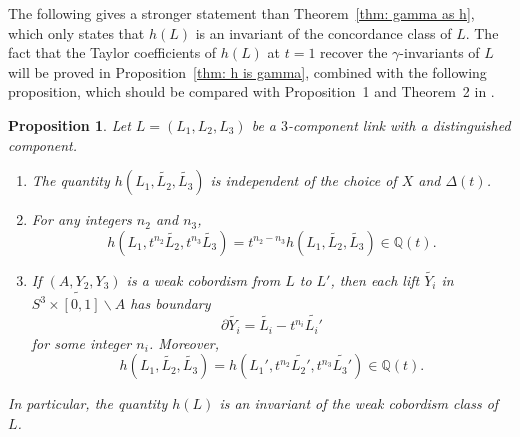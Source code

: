 \documentclass[a4paper, 11pt]{amsart}
\newtheorem{proposition}[theorem]{Proposition}
\newtheorem{corollary}[theorem]{Corollary}
\theoremstyle{definition}
\newcommand{\Q}{\mathbb{Q}}
\newcommand{\noteta}{h}
\begin{document}
The following gives a stronger statement than Theorem~\ref{thm: gamma as h}, which only states that $h(L)$ is an invariant of the concordance class of $L$. The fact that the Taylor coefficients of $h(L)$ at $t=1$ recover the $\gamma$-invariants of $L$ will be proved in Proposition~\ref{thm: h is gamma}, combined with the following proposition, which should be compared with Proposition~1 and Theorem~2 in \cite{KojYam79}.

\begin{proposition}\label{prop h is invariant}
Let $L=(L_1,L_2,L_3)$ be a $3$-component link with a distinguished component.
\begin{enumerate}
\item \label{indep of X and Delta}
The quantity $\noteta(L_1,\widetilde{L_2},\widetilde{L_3})$ is independent of the choice of $X$ and $\Delta(t)$.

\item \label{choice of lifts}
For any integers $n_2$ and $n_3$,
\[
\noteta(L_1,t^{n_2}\widetilde{L_2},t^{n_3}\widetilde{L_3})
=
t^{n_2-n_3}\noteta(L_1,\widetilde{L_2},\widetilde{L_3})\in \Q(t).
\]

\item \label{item: weak cob}
If $(A,Y_2,Y_3)$ is a weak cobordism from $L$ to $L'$, then each lift $\widetilde{Y_i}$ in
$\widetilde{S^3\times[0,1]\smallsetminus A}$ has boundary
\[
\partial \widetilde{Y_i}=\widetilde{L_i}-t^{n_i}\widetilde{L_i'}
\]
for some integer $n_i$. Moreover,
\[
\noteta(L_1,\widetilde{L_2},\widetilde{L_3})
=
\noteta(L_1',t^{n_2}\widetilde{L_2'},t^{n_3}\widetilde{L_3'}) \in \Q(t).
\]
\end{enumerate}
In particular, the quantity $h(L)$ is an invariant of the weak cobordism class of $L$.
\end{proposition}





\end{document}
